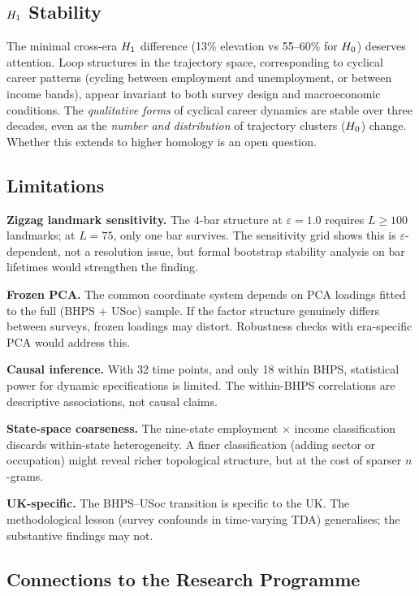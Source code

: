 \subsection{$H_{1}$ Stability}

The minimal cross-era $H_{1}$ difference (13\% elevation vs 55--60\% for
$H_{0}$) deserves attention.
Loop structures in the trajectory space, corresponding to cyclical career
patterns (cycling between employment and unemployment, or between income bands),
appear invariant to both survey design and macroeconomic conditions.
The \emph{qualitative forms} of cyclical career dynamics are stable over three
decades, even as the \emph{number and distribution} of trajectory clusters
($H_{0}$) change.
Whether this extends to higher homology is an open question.

\subsection{Limitations}

\textbf{Zigzag landmark sensitivity.}
The 4-bar structure at $\varepsilon = 1.0$ requires $L \geq 100$ landmarks; at
$L = 75$, only one bar survives.
The sensitivity grid shows this is $\varepsilon$-dependent, not a resolution
issue, but formal bootstrap stability analysis on bar lifetimes would strengthen
the finding.

\textbf{Frozen PCA.}
The common coordinate system depends on PCA loadings fitted to the full (BHPS +
USoc) sample.
If the factor structure genuinely differs between surveys, frozen loadings may
distort.
Robustness checks with era-specific PCA would address this.

\textbf{Causal inference.}
With 32 time points, and only 18 within BHPS, statistical power for dynamic
specifications is limited.
The within-BHPS correlations are descriptive associations, not causal claims.

\textbf{State-space coarseness.}
The nine-state employment $\times$ income classification discards within-state
heterogeneity.
A finer classification (adding sector or occupation) might reveal richer
topological structure, but at the cost of sparser $n$-grams.

\textbf{UK-specific.}
The BHPS--USoc transition is specific to the UK.
The methodological lesson (survey confounds in time-varying TDA) generalises; the
substantive findings may not.

\subsection{Connections to the Research Programme}


